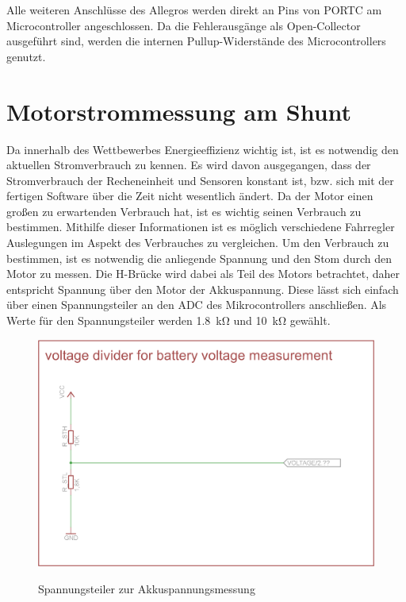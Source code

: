 Alle weiteren Anschlüsse des Allegros werden direkt an Pins von PORTC am Microcontroller angeschlossen. Da die Fehlerausgänge als Open-Collector ausgeführt sind, werden die internen Pullup-Widerstände des Microcontrollers genutzt.



\section{Motorstrommessung am Shunt}

Da innerhalb des Wettbewerbes Energieeffizienz wichtig ist, ist es notwendig den aktuellen Stromverbrauch zu kennen. Es wird davon ausgegangen, dass der Stromverbrauch der Recheneinheit und Sensoren
konstant ist, bzw. sich mit der fertigen Software über die Zeit nicht wesentlich ändert. Da der Motor einen großen zu erwartenden Verbrauch hat, ist es wichtig seinen Verbrauch zu bestimmen. Mithilfe dieser
Informationen ist es möglich verschiedene Fahrregler Auslegungen im Aspekt des Verbrauches zu vergleichen. Um den Verbrauch zu bestimmen, ist es notwendig die anliegende Spannung und den Stom durch den
Motor zu messen. Die H-Brücke wird dabei als Teil des Motors betrachtet, daher entspricht Spannung über den Motor der Akkuspannung. Diese lässt sich einfach über einen Spannungsteiler an den ADC des Mikrocontrollers
anschließen. Als Werte für den Spannungsteiler werden \SI{1,8}{\kohm} und \SI{10}{\kohm} gewählt.

\begin{figure}[H]
\centering
\includegraphics[width=\textwidth]{spannungsteiler.png}\\
\caption{Spannungsteiler zur Akkuspannungsmessung}%
\label{fig:Spannungsteiler}
\end{figure}

